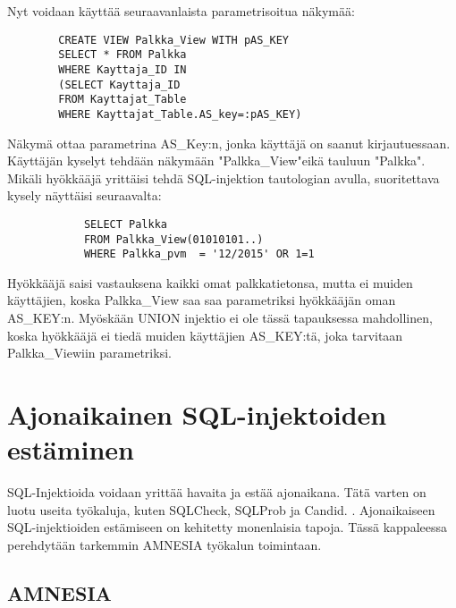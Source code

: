 \documentclass[finnish]{tktltiki2}
\theoremstyle{definition}
\theoremstyle{remark}
\begin{document}
		Nyt voidaan käyttää seuraavanlaista parametrisoitua näkymää:
		\begin{lstlisting}
		CREATE VIEW Palkka_View WITH pAS_KEY
		SELECT * FROM Palkka
		WHERE Kayttaja_ID IN
		(SELECT Kayttaja_ID
		FROM Kayttajat_Table
		WHERE Kayttajat_Table.AS_key=:pAS_KEY) 
		\end{lstlisting}
		Näkymä ottaa parametrina AS\_Key:n, jonka käyttäjä on saanut kirjautuessaan. Käyttäjän kyselyt tehdään näkymään "Palkka\_View"\space eikä tauluun "Palkka". Mikäli hyökkääjä yrittäisi tehdä SQL-injektion tautologian avulla, suoritettava kysely näyttäisi seuraavalta:
		\begin{lstlisting}
			SELECT Palkka
			FROM Palkka_View(01010101..) 
			WHERE Palkka_pvm  = '12/2015' OR 1=1
		\end{lstlisting}
		Hyökkääjä saisi vastauksena kaikki omat palkkatietonsa, mutta ei muiden käyttäjien, koska Palkka\_View saa saa parametriksi hyökkääjän oman AS\_KEY:n. Myöskään UNION injektio ei ole tässä tapauksessa mahdollinen, koska hyökkääjä ei tiedä muiden käyttäjien AS\_KEY:tä, joka tarvitaan Palkka\_Viewiin parametriksi.
	
	\section{Ajonaikainen SQL-injektoiden estäminen}
	SQL-Injektioida voidaan yrittää havaita ja estää ajonaikana. Tätä varten on luotu useita työkaluja, kuten SQLCheck, SQLProb ja Candid. \cite{preventions}. Ajonaikaiseen SQL-injektioiden estämiseen on kehitetty monenlaisia tapoja. Tässä kappaleessa perehdytään tarkemmin AMNESIA työkalun toimintaan. 
	
	\subsection{AMNESIA}
	
\end{document}
